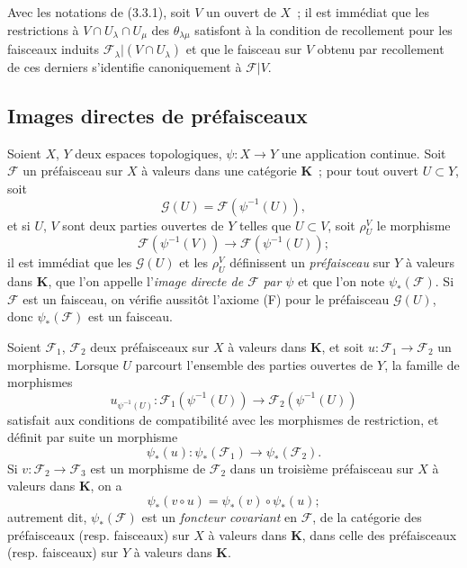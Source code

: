 \begin{env}[3.3.3]
\label{0.3.3.3-fr}
Avec les notations de (3.3.1), soit $V$ un ouvert de $X$~; il est immédiat que
les restrictions à $V\cap U_\lambda\cap U_\mu$ des $\theta_{\lambda\mu}$
satisfont à la condition de recollement pour les faisceaux induits
$\mathcal{F}_\lambda|(V\cap U_\lambda)$ et que le faisceau sur $V$ obtenu par
recollement de ces derniers s'identifie canoniquement à $\mathcal{F}|V$.
\end{env}

\subsection{Images directes de préfaisceaux}
\label{subsection:0.3.4-fr}

\begin{env}[3.4.1]
\label{0.3.4.1-fr}
Soient $X$, $Y$ deux espaces topologiques, $\psi:X\to Y$ une application
continue. Soit $\mathcal{F}$ un préfaisceau sur $X$ à valeurs dans une
catégorie $\boldsymbol{K}$~; pour tout ouvert $U\subset Y$, soit
\[
  \mathcal{G}(U)=\mathcal{F}(\psi^{-1}(U)),
\]
et si $U$, $V$ sont deux parties ouvertes de $Y$ telles que $U\subset V$, soit
$\rho_U^V$ le morphisme
\[
  \mathcal{F}(\psi^{-1}(V))\to\mathcal{F}(\psi^{-1}(U));
\]
il est immédiat que les $\mathcal{G}(U)$ et les $\rho_U^V$ définissent un
\emph{préfaisceau} sur $Y$ à valeurs dans $\boldsymbol{K}$, que l'on appelle
l'\emph{image directe de $\mathcal{F}$ par $\psi$} et que l'on note
$\psi_*(\mathcal{F})$. Si $\mathcal{F}$ est un faisceau, on vérifie aussitôt
l'axiome (F) pour le préfaisceau $\mathcal{G}(U)$, donc
$\psi_*(\mathcal{F})$ est un faisceau.
\end{env}

\begin{env}[3.4.2]
\label{0.3.4.2-fr}
Soient $\mathcal{F}_1$, $\mathcal{F}_2$ deux préfaisceaux sur $X$ à valeurs
dans $\boldsymbol{K}$, et soit $u:\mathcal{F}_1\to\mathcal{F}_2$ un morphisme.
Lorsque $U$ parcourt l'ensemble des parties ouvertes de $Y$, la famille de
morphismes
\[
  u_{\psi^{-1}(U)}:
  \mathcal{F}_1(\psi^{-1}(U))\to\mathcal{F}_2(\psi^{-1}(U))
\]
satisfait aux conditions de compatibilité avec les morphismes de restriction,
et définit par suite un morphisme
\[
  \psi_*(u):\psi_*(\mathcal{F}_1)\to\psi_*(\mathcal{F}_2).
\]
Si $v:\mathcal{F}_2\to\mathcal{F}_3$ est un morphisme de $\mathcal{F}_2$ dans
un troisième préfaisceau sur $X$ à valeurs dans $\boldsymbol{K}$, on a
\[
  \psi_*(v\circ u)=\psi_*(v)\circ\psi_*(u);
\]
autrement dit, $\psi_*(\mathcal{F})$ est un \emph{foncteur covariant} en
$\mathcal{F}$, de la catégorie des préfaisceaux (resp. faisceaux) sur $X$ à
valeurs dans $\boldsymbol{K}$, dans celle des préfaisceaux (resp. faisceaux) sur
$Y$ à valeurs dans $\boldsymbol{K}$.
\end{env}

